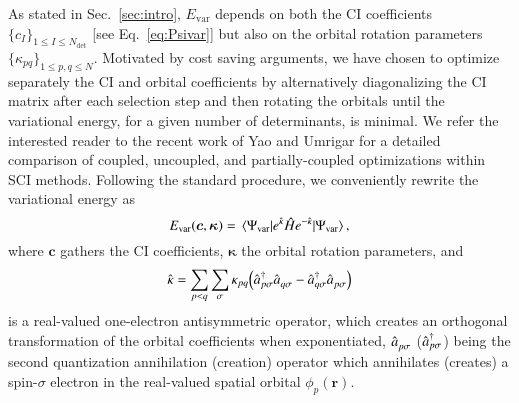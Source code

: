 \documentclass[aip,jcp,reprint,noshowkeys,superscriptaddress,floatfix]{revtex4-1}
\newcommand{\Norb}{N}
\newcommand{\Ndet}{N_\text{det}}
\newcommand{\hH}{\Hat{H}}
\newcommand{\hk}{\Hat{\kappa}}
\newcommand{\cre}[1]{\Hat{a}_{#1}^{\dagger}}
\newcommand{\ani}[1]{\Hat{a}_{#1}^{}}
\newcommand{\bk}{\boldsymbol{\kappa}}
\newcommand{\bc}{\boldsymbol{c}}
\newcommand{\br}{\boldsymbol{r}}
\newcommand{\Evar}{E_\text{var}}
\newcommand{\Psivar}{\Psi_\text{var}}
\newcommand{\MO}[1]{\phi_{#1}}
\begin{document}
As stated in Sec.~\ref{sec:intro}, $\Evar$ depends on both the CI coefficients $\{ c_I \}_{1 \le I \le \Ndet}$ [see Eq.~\eqref{eq:Psivar}] but also on the orbital rotation parameters $\{\kappa_{pq}\}_{1 \le p,q \le \Norb}$.
Motivated by cost saving arguments, we have chosen to optimize separately the CI and orbital coefficients by alternatively diagonalizing the CI matrix after each selection step and then rotating the orbitals until the variational energy, for a given number of determinants, is minimal. 
We refer the interested reader to the recent work of Yao and Umrigar for a detailed comparison of coupled, uncoupled, and partially-coupled optimizations within SCI methods. \cite{Yao_2021}
Following the standard procedure, \cite{Helgaker_2013} we conveniently rewrite the variational energy as
\begin{equation}
\label{eq:Evar_c_k}
	\Evar(\bc,\bk) = \mel{\Psivar}{e^{\hk} \hH e^{-\hk}}{\Psivar},
\end{equation}
where $\bc$ gathers the CI coefficients, $\bk$ the orbital rotation parameters, and
\begin{equation}
	\hk = \sum_{p < q} \sum_{\sigma} \kappa_{pq} \qty(\cre{p\sigma} \ani{q\sigma} - \cre{q\sigma} \ani{p\sigma})
\end{equation}
is a real-valued one-electron antisymmetric operator, which creates an orthogonal transformation of the orbital coefficients when exponentiated, $\ani{p\sigma}$ ($\cre{p\sigma}$) being the second quantization annihilation (creation) operator which annihilates (creates) a spin-$\sigma$ electron in the real-valued spatial orbital $\MO{p}(\br)$. \cite{Helgaker_2013}
\end{document}
